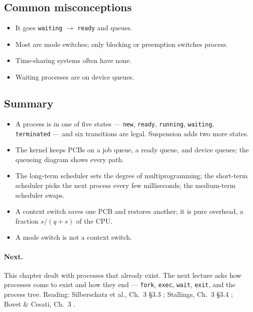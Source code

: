 \documentclass[11pt]{article}
\begin{document}
\subsection{Common misconceptions}

\begin{itemize}
  \item {} It goes
        \texttt{waiting} $\to$ \texttt{ready} and queues.
  \item {} Most are mode
        switches; only blocking or preemption switches process.
  \item {} Time-sharing systems
        often have none.
  \item {} Waiting processes are
        on device queues.
\end{itemize}

\subsection{Summary}

\begin{itemize}
  \item A process is in one of five states --- \texttt{new}, \texttt{ready},
        \texttt{running}, \texttt{waiting}, \texttt{terminated} --- and six
        transitions are legal. Suspension adds two more states.
  \item The kernel keeps PCBs on a job queue, a ready queue, and device queues;
        the queueing diagram shows every path.
  \item The long-term scheduler sets the degree of multiprogramming; the
        short-term scheduler picks the next process every few milliseconds; the
        medium-term scheduler swaps.
  \item A context switch saves one PCB and restores another; it is pure
        overhead, a fraction $s/(q+s)$ of the CPU.
  \item A mode switch is not a context switch.
\end{itemize}

\paragraph{Next.} This chapter dealt with processes that already exist. The
next lecture asks how processes come to exist and how they end ---
\texttt{fork}, \texttt{exec}, \texttt{wait}, \texttt{exit}, and the process
tree. Reading: Silberschatz et al., Ch.~3 \S3.3
\cite{SilberschatzOSC_operating_system_concepts}; Stallings, Ch.~3 \S3.4
\cite{StallingsOS_internals_design_principles}; Bovet \& Cesati, Ch.~3
\cite{BovetCesati_understanding_linux_kernel}.
\end{document}
